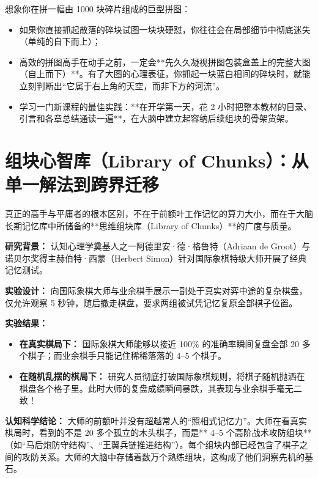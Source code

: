 \documentclass[12pt,a4paper,openany]{ctexbook}
\begin{document}
\begin{extensionbox}
想象你在拼一幅由 1000 块碎片组成的巨型拼图：
\begin{itemize}
    \item 如果你直接抓起散落的碎块试图一块块硬怼，你往往会在局部细节中彻底迷失（单纯的自下而上）；
    \item 高效的拼图高手在动手之前，一定会**先久久凝视拼图包装盒盖上的完整大图（自上而下）**。有了大图的心理表征，你抓起一块蓝白相间的碎块时，就能立刻判断出“它属于右上角的天空，而非下方的河流”。
    \item 学习一门新课程的最佳实践：**在开学第一天，花 2 小时把整本教材的目录、引言和各章总结通读一遍**，在大脑中建立起容纳后续组块的骨架货架。
\end{itemize}
\end{extensionbox}

\section{组块心智库（Library of Chunks）：从单一解法到跨界迁移}

真正的高手与平庸者的根本区别，不在于前额叶工作记忆的算力大小，而在于大脑长期记忆库中所储备的**思维组块库（Library of Chunks）**的广度与质量。

\begin{casebox}[国际象棋大师与业余爱好者的组块容量对比]
\textbf{研究背景：} 认知心理学奠基人之一阿德里安·德·格鲁特（Adriaan de Groot）与诺贝尔奖得主赫伯特·西蒙（Herbert Simon）针对国际象棋特级大师开展了经典记忆测试。

\textbf{实验设计：}
向国际象棋大师与业余棋手展示一副处于真实对弈中途的复杂棋盘，仅允许观察 5 秒钟，随后撤走棋盘，要求两组被试凭记忆复原全部棋子位置。

\textbf{实验结果：}
\begin{itemize}
    \item \textbf{在真实棋局下：} 国际象棋大师能够以接近 100\% 的准确率瞬间复盘全部 20 多个棋子；而业余棋手只能记住稀稀落落的 4--5 个棋子。
    \item \textbf{在随机乱摆的棋局下：} 研究人员彻底打破国际象棋规则，将棋子随机抛洒在棋盘各个格子里。此时大师的复盘成绩瞬间暴跌，其表现与业余棋手毫无二致！
\end{itemize}

\textbf{认知科学结论：}
大师的前额叶并没有超越常人的“照相式记忆力”。大师在看真实棋局时，看到的不是 20 多个孤立的木头棋子，而是** 4--5 个高阶战术攻防组块**（如“马后炮防守结构”、“王翼兵链推进结构”）。每个组块内部已经包含了棋子之间的攻防关系。大师的大脑中存储着数万个熟练组块，这构成了他们洞察先机的基石。
\end{casebox}
\end{document}
